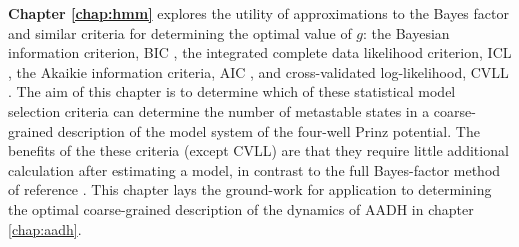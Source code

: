 \textbf{Chapter \ref{chap:hmm}} explores the utility of approximations to the Bayes factor and similar criteria for determining the optimal value of $g$: the Bayesian information criterion, BIC \cite{schwarzEstimatingDimensionModel1978a}, the integrated complete data likelihood criterion, ICL \cite{biernackiAssessingMixtureModel2000a}, the Akaikie information criteria, AIC \cite{akaikeInformationTheoryExtension1998}, and cross-validated log-likelihood, CVLL \cite{celeuxSelectingHiddenMarkov2008}. The aim of this chapter is to determine which of these statistical model selection criteria can determine the number of metastable states in a coarse-grained description of the model system of the four-well Prinz potential. The benefits of the these criteria (except CVLL) are that they require little additional calculation after estimating a model, in contrast to the full Bayes-factor method of reference \cite{bacalladoBayesianComparisonMarkov2009a}.  This chapter lays the ground-work for application to determining the optimal coarse-grained description of the dynamics of AADH in chapter \ref{chap:aadh}. 

